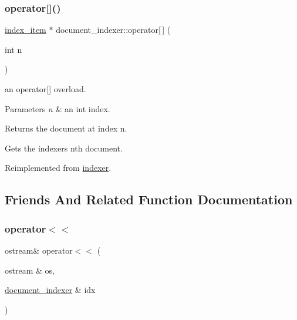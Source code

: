 \subsubsection{\texorpdfstring{operator[]()}{operator[]()}\hspace{0.1cm}{\footnotesize\ttfamily [2/2]}}
{\footnotesize\ttfamily \hyperlink{classindex__item}{index\+\_\+item} $\ast$ document\+\_\+indexer\+::operator\mbox{[}$\,$\mbox{]} (\begin{DoxyParamCaption}\item[{int}]{n }\end{DoxyParamCaption})\hspace{0.3cm}{\ttfamily [virtual]}}



an operator\mbox{[}\mbox{]} overload. 


\begin{DoxyParams}{Parameters}
{\em n} & an int index. \\
\hline
\end{DoxyParams}
\begin{DoxyReturn}{Returns}
the document at index n.
\end{DoxyReturn}
Gets the indexer\textquotesingle{}s n\textquotesingle{}th document. 

Reimplemented from \hyperlink{classindexer_ae71041fc84d94155473de60e4407d5cc}{indexer}.



\subsection{Friends And Related Function Documentation}
\mbox{\label{classdocument__indexer_aa4cd3fa3dc189d5e7dc4b07ed98958e8}} 
\subsubsection{\texorpdfstring{operator$<$$<$}{operator<<}}
{\footnotesize\ttfamily ostream\& operator$<$$<$ (\begin{DoxyParamCaption}\item[{ostream \&}]{os,  }\item[{\hyperlink{classdocument__indexer}{document\+\_\+indexer} \&}]{idx }\end{DoxyParamCaption})\hspace{0.3cm}{\ttfamily [friend]}}



